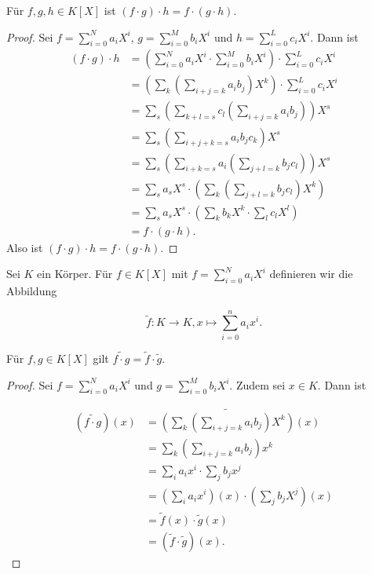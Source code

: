 \documentclass{article}
\begin{document}
Für $f,g,h \in K[X]$ ist $(f \cdot g) \cdot h = f \cdot (g \cdot h)$.

\begin{proof}
  Sei $f = \sum_{i=0}^N a_i X^i$, $g = \sum_{i=0}^M b_i X^i$ und $h = \sum_{i=0}^L c_i X^i$.
  Dann ist
  \[
    \begin{aligned}
      (f \cdot g) \cdot h & = \left( \sum_{i=0}^N a_i X^i \cdot \sum_{i=0}^M b_i X^i \right) \cdot \sum_{i=0}^L c_i X^i \\
                          & = \left(\sum_{k} \left(\sum_{i+j=k} a_i b_j\right) X^k\right) \cdot \sum_{i=0}^L c_i X^i    \\
                          & = \sum_s \left(\sum_{k+l=s} c_l \left(\sum_{i+j=k} a_i b_j\right)\right) X^s                \\
                          & = \sum_s \left(\sum_{i+j+k=s} a_i b_j c_k\right) X^s                                        \\
                          & = \sum_s \left(\sum_{i+k=s} a_i \left(\sum_{j+l=k} b_j c_l\right)\right) X^s                \\
                          & = \sum_{s} a_s X^s \cdot \left(\sum_{k} \left( \sum_{j+l=k} b_j c_l\right) X^k\right)       \\
                          & = \sum_{s} a_s X^s \cdot \left(\sum_{k} b_k X^k \cdot \sum_{l} c_l X^l\right)               \\
                          & = f \cdot (g \cdot h).
    \end{aligned}
  \]
  Also ist $(f \cdot g) \cdot h = f \cdot (g \cdot h)$.
\end{proof}


\newpage

Sei $K$ ein Körper. Für $f \in K[X]$ mit $f = \sum_{i=0}^N a_i X^i$
definieren wir die Abbildung

\[
  \tilde{f} : K \to K, x \mapsto \sum_{i=0}^{n} a_i x^i.
\]

Für $f,g \in K[X]$ gilt $\widetilde{f \cdot g} = \tilde{f} \cdot \tilde{g} $.
\begin{proof}
  Sei $f = \sum_{i=0}^N a_i X^i$ und $g = \sum_{i=0}^M b_i X^i$.
  Zudem sei $x \in K$.
  Dann ist

  \[
    \begin{aligned}
      (\widetilde{f \cdot g})(x)
       & = \widetilde{\left( \sum_k \left( \sum_{i+j=k} a_i b_j \right) X^k \right)}(x) \\
       & = \sum_k \left( \sum_{i+j=k} a_i b_j \right) x^k                               \\
       & = \sum_i a_i x^i \cdot \sum_j b_j x^j                                          \\
       & = \left(\sum_i a_i x^i \right)(x) \cdot \left(\sum_j b_j X^j\right)(x)         \\
       & = \widetilde{f}(x) \cdot \widetilde{g}(x)                                      \\
       & = (\tilde{f} \cdot \tilde{g})(x).
    \end{aligned}
  \]
\end{proof}
\end{document}
